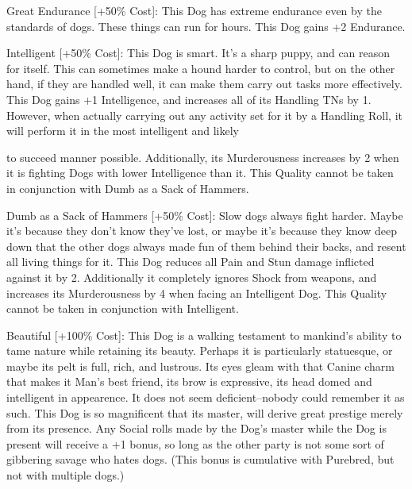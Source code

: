 \documentclass[oneside,11pt,english]{book}
\begin{document}
 

Great Endurance [+50\% Cost]: This Dog has extreme endurance even by the standards of dogs. These 
things can run for hours. 
This Dog gains +2 Endurance. 

 

Intelligent [+50\% Cost]: This Dog is smart. It’s a sharp puppy, and can reason for itself. This can 
sometimes make a hound harder to control, but on the other hand, if they are handled well, it can make 
them carry out tasks more effectively. 
This Dog gains +1 Intelligence, and increases all of its Handling TNs by 1. However, when actually 
carrying out any activity set for it by a Handling Roll, it will perform it in the most intelligent and likely 


to succeed manner possible. Additionally, its Murderousness increases by 2 when it is fighting Dogs with 
lower Intelligence than it. 
This Quality cannot be taken in conjunction with Dumb as a Sack of Hammers. 

 

Dumb as a Sack of Hammers [+50\% Cost]: Slow dogs always fight harder. Maybe it’s because they 
don’t know they’ve lost, or maybe it’s because they know deep down that the other dogs always made fun 
of them behind their backs, and resent all living things for it. This Dog reduces all Pain and Stun damage 
inflicted against it by 2. Additionally it completely ignores Shock from weapons, and increases its 
Murderousness by 4 when facing an Intelligent Dog. 
This Quality cannot be taken in conjunction with Intelligent. 

 

Beautiful [+100\% Cost]: This Dog is a walking testament to mankind’s ability to tame nature while 
retaining its beauty. Perhaps it is particularly statuesque, or maybe its pelt is full, rich, and lustrous. Its 
eyes gleam with that Canine charm that makes it Man’s best friend, its brow is expressive, its head domed 
and intelligent in appearence. It does not seem deficient--nobody could remember it as such. 
This Dog is so magnificent that its master, will derive great prestige merely from its presence. Any Social 
rolls made by the Dog’s master while the Dog is present will receive a +1 bonus, so long as the other 
party is not some sort of gibbering savage who hates dogs. (This bonus is cumulative with Purebred, but 
not with multiple dogs.) 

 
\end{document}
